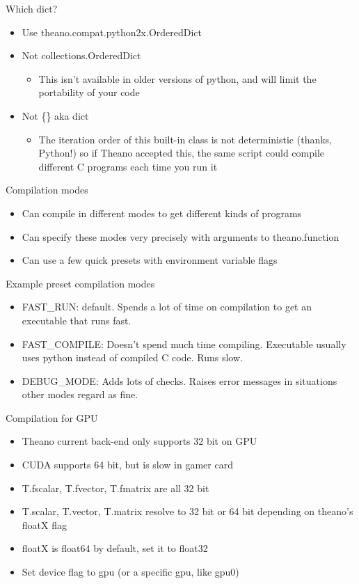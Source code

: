 \documentclass[utf8x,xcolor=pdftex,dvipsnames,table]{beamer}
\begin{document}
\begin{frame}{Which dict?}
  \begin{itemize}
  \item Use theano.compat.python2x.OrderedDict
  \item Not collections.OrderedDict
  \begin{itemize}
  \item This isn’t available in older versions of python,
and will limit the portability of your code
  \end{itemize}
  \item Not \{\} aka dict
  \begin{itemize}
  \item The iteration order of this built-in class is not
    deterministic (thanks, Python!) so if Theano
    accepted this, the same script could compile
    different C programs each time you run it
  \end{itemize}
  \end{itemize}
\end{frame}

\begin{frame}{Compilation modes}
  \begin{itemize}
  \item Can compile in different modes to get different kinds of programs
  \item Can specify these modes very precisely with arguments to theano.function
  \item Can use a few quick presets with environment variable flags
  \end{itemize}
\end{frame}

\begin{frame}{Example preset compilation modes}
  \begin{itemize}
  \item FAST\_RUN: default. Spends a lot of time on
compilation to get an executable that runs
fast.
  \item FAST\_COMPILE: Doesn’t spend much time
compiling. Executable usually uses python
instead of compiled C code. Runs slow.
  \item DEBUG\_MODE: Adds lots of checks.
Raises error messages in situations other
modes regard as fine.
  \end{itemize}
\end{frame}

\begin{frame}{Compilation for GPU}
  \begin{itemize}
  \item Theano current back-end only supports 32 bit on GPU
  \item CUDA supports 64 bit, but is slow in gamer card
  \item T.fscalar, T.fvector, T.fmatrix are all 32 bit
  \item T.scalar, T.vector, T.matrix resolve to 32 bit or 64 bit depending on theano’s floatX flag
  \item floatX is float64 by default, set it to float32
  \item Set device flag to gpu (or a specific gpu, like gpu0)
  \end{itemize}
\end{frame}
\end{document}

